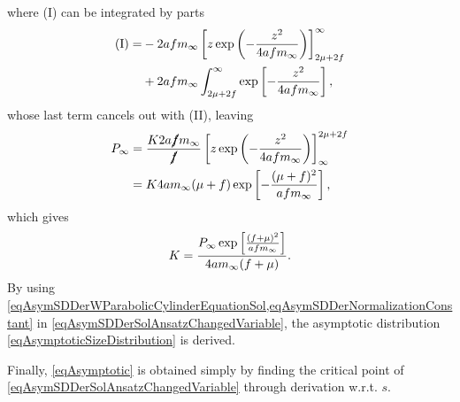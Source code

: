                 where (I) can be integrated by parts
                \begin{align*}
                    (\text{I})=&-2afm_\infty\left[z\exp\left(-\frac{z^2}{4afm_\infty}\right)\right]_{2\mu+2f}^\infty\\
                    &+2afm_\infty\int_{2\mu+2f}^\infty\exp\left[-\frac{z^2}{4afm_\infty}\right],
                \end{align*}
                whose last term cancels out with (II), leaving
                \begin{align*}
                    P_\infty&=\frac {K2a\cancel fm_\infty}{\cancel f}
                    \left[z\exp\left(-\frac{z^2}{4afm_\infty}\right)\right]^{2\mu+2f}_\infty\\
                    &=K4am_\infty(\mu+f)\exp\left[-\frac{(\mu+f)^2}{afm_\infty}\right],
                \end{align*}
                which gives \cite[(77) on p. 11]{Goriely2019}
                \begin{equation}
                    K=\frac{P_\infty\exp\left[\frac{(f+\mu)^2}{afm_\infty}\right]}{4am_\infty(f+\mu)}.
                    \label{eqAsymSDDerNormalizationConstant}
                \end{equation}
                By using \cref{eqAsymSDDerWParabolicCylinderEquationSol,eqAsymSDDerNormalizationConstant} in \eqref{eqAsymSDDerSolAnsatzChangedVariable}, the asymptotic distribution \eqref{eqAsymptoticSizeDistribution} is derived.

                \hfill\blacksquare

                Finally, \eqref{eqAsymptotic} is obtained simply by finding the critical point of \eqref{eqAsymSDDerSolAnsatzChangedVariable} through derivation w.r.t. $s$.




            
            
